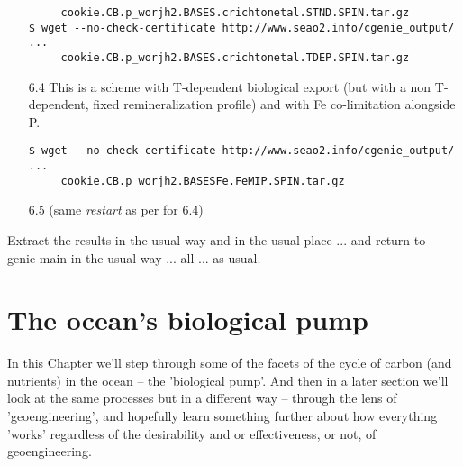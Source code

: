 \begin{itemize}[noitemsep]
\begin{verbatim}
     cookie.CB.p_worjh2.BASES.crichtonetal.STND.SPIN.tar.gz
$ wget --no-check-certificate http://www.seao2.info/cgenie_output/ ...
     cookie.CB.p_worjh2.BASES.crichtonetal.TDEP.SPIN.tar.gz
\end{verbatim} \normalsize
\vspace{2mm}
\item [6.4] This is a scheme with T-dependent biological export (but with a non T-dependent, fixed remineralization profile) and with Fe co-limitation alongside P.
\vspace{-1mm}\small\begin{verbatim}
$ wget --no-check-certificate http://www.seao2.info/cgenie_output/ ...
     cookie.CB.p_worjh2.BASESFe.FeMIP.SPIN.tar.gz
\end{verbatim}\normalsize
\vspace{2mm}
\item [6.5] (same \textit{restart} as per for 6.4)
\end{itemize}

\vspace{2mm}
\noindent Extract the results in the usual way and in the usual place ... and return to \textsf{\footnotesize genie-main} in the usual way ... all ... as usual.

\newpage

\section*{The ocean's biological pump}

In this Chapter we'll step through some of the facets of the cycle of carbon (and nutrients) in the ocean -- the 'biological pump'. And then in a later section we'll look at the same processes but in a different way -- through the lens of 'geoengineering', and hopefully learn something further about how everything 'works' regardless of the desirability and or effectiveness, or not, of geoengineering.

